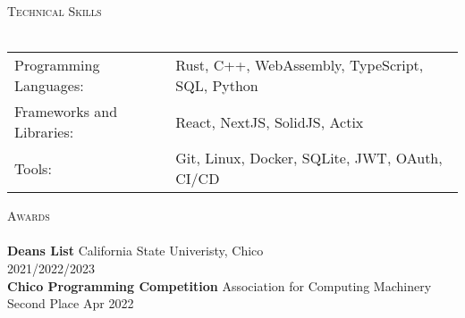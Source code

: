 \documentclass[a4paper]{article}
\newcommand{\lineunder} {
    \vspace*{-8pt} \\
    \hspace*{-18pt} \hrulefill \\
}
\newcommand{\header} [1] {
    {\hspace*{-18pt}\vspace*{6pt} \textsc{#1}}
    \vspace*{-6pt} \lineunder
}
\begin{document}
\header{Technical Skills}
\begin{tabular}{ l l }
	Programming Languages:    & Rust, C++, WebAssembly, TypeScript, SQL, Python \\
	Frameworks and Libraries: & React, NextJS, SolidJS, Actix                   \\
	Tools:                    & Git, Linux, Docker, SQLite, JWT, OAuth, CI/CD   \\
\end{tabular}
\vspace{2mm}

\header{Awards}
\textbf{Dean\textquotesingle{}s List} \hfill California State Univeristy, Chico\\
\hfill 2021/2022/2023\\
\vspace*{2mm}
\textbf{Chico Programming Competition} \hfill Association for Computing Machinery\\
Second Place \hfill Apr 2022\\
\vspace*{2mm}

\ 
\end{document}
